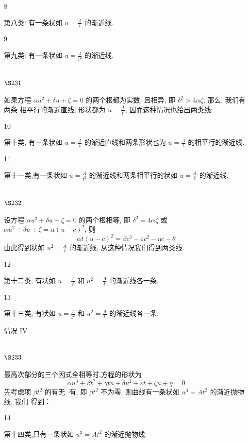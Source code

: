 8

第八类: 有一条状如 $u=\frac{A}{t}$ 的渐近线.

9

第九类: 有一条状如 $u=\frac{A}{t^{2}}$ 的渐近线.

\section{$\S 231$}

如果方程 $\alpha u^{2}+\delta u+\zeta=0$ 的两个根都为实数, 且相异, 即 $\delta^{2}>4 \alpha \zeta$, 那么, 我们有两条 相平行的渐近直线, 形状都为 $u=\frac{A}{t}$, 因而这种情况也给出两类线: 

10

第十类, 有一条状如 $u=\frac{A}{t}$ 的渐近直线和两条形状也为 $u=\frac{A}{t}$ 的相平行的渐近线.

11

第十一类,有一条状如 $u=\frac{A}{t^{2}}$ 的渐近线和两条相平行的状如 $u=\frac{A}{t}$ 的渐近线.

\section{$\S 232$}

设方程 $\alpha u^{2}+\delta u+\zeta=0$ 的两个根相等, 即 $\delta^{2}=4 \alpha \zeta$ 或 $\alpha u^{2}+\delta u+\zeta=\alpha(u-c)^{2}$, 则
\[
\alpha t(u-c)^{2}=\beta c^{3}-\varepsilon c^{2}-\eta c-\theta
\]
由此得到状如 $u^{2}=\frac{A}{t}$ 的渐近线, 从这种情况我们得到两类线.

12

第十二类, 有状如 $u=\frac{A}{t}$ 和 $u^{2}=\frac{A}{t}$ 的渐近线各一条.

13

第十三类, 有状如 $u=\frac{A}{t^{2}}$ 和 $u^{2}=\frac{A}{t}$ 的渐近线各一条.

情况 IV

\section{$\S 233$}

最高次部分的三个因式全相等时,方程的形状为
\[
\alpha u^{3}+\beta t^{2}+\gamma t u+\delta u^{2}+\varepsilon t+\zeta u+\eta=0
\]
先考虑项 $\beta t^{2}$ 的有无. 有, 即 $\beta t^{2}$ 不为零, 则曲线有一条状如 $u^{3}=A t^{2}$ 的渐近抛物线, 我们 得到：

14

第十四类,只有一条状如 $u^{3}=A t^{2}$ 的渐近抛物线.

